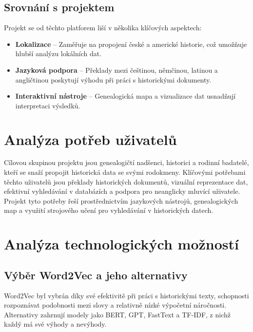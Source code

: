 \documentclass[czech, ba, kiv, he]{fasthesis}
\begin{document}
\subsection{Srovnání s projektem}
Projekt se od těchto platforem liší v několika klíčových aspektech:

\begin{itemize}
    \item \textbf{Lokalizace} -- Zaměřuje na propojení české a americké historie, což umožňuje hlubší analýzu lokálních dat.
    \item \textbf{Jazyková podpora} -- Překlady mezi češtinou, němčinou, latinou a angličtinou poskytují výhodu při práci s historickými dokumenty.
    \item \textbf{Interaktivní nástroje} -- Genealogická mapa a vizualizace dat usnadňují interpretaci výsledků.
\end{itemize}



\section{Analýza potřeb uživatelů}

Cílovou skupinou projektu jsou genealogičtí nadšenci, historici a rodinní badatelé, kteří se snaží propojit historická data se svými rodokmeny. Klíčovými potřebami těchto uživatelů jsou překlady historických dokumentů, vizuální reprezentace dat, efektivní vyhledávání v databázích a podpora pro neanglicky mluvící uživatele. Projekt tyto potřeby řeší prostřednictvím jazykových nástrojů, genealogických map a využití strojového učení pro vyhledávání v historických datech.

\section{Analýza technologických možností}

\subsection{Výběr Word2Vec a jeho alternativy}

Word2Vec byl vybrán díky své efektivitě při práci s historickými texty, schopnosti rozpoznávat podobnosti mezi slovy a relativně nízké výpočetní náročnosti. Alternativy zahrnují modely jako BERT, GPT, FastText a TF-IDF, z nichž každý má své výhody a nevýhody.
\end{document}
